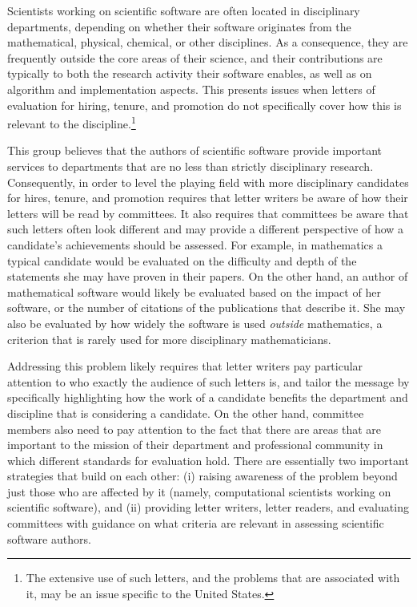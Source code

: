 \documentclass[11pt, oneside]{amsart}
\begin{document}
Scientists working on scientific software are often located in
disciplinary departments, depending on whether their software
originates from the mathematical, physical, chemical, or other
disciplines. As a consequence, they are frequently outside the core
areas of their science, and their contributions are typically to both
the research activity their software enables, as well as on
algorithm and implementation aspects. This presents issues when
letters of evaluation for hiring, tenure, and promotion do not specifically
cover how this is relevant to the discipline.\footnote{The extensive use of such letters, and the problems that are
  associated with it, may be an issue specific to the United States.}

This group believes that the authors of scientific software provide important
services to departments that are no less than strictly disciplinary
research. Consequently, in order to level the playing field with more
disciplinary candidates for hires, tenure, and promotion requires that
letter writers be aware of how their letters will be read by
committees. It also requires that committees be aware that such
letters often look different and may provide a different perspective
of how a candidate's achievements should be assessed. For example, in
mathematics a typical candidate would be evaluated on the difficulty
and depth of the statements she may have proven in their papers. On
the other hand, an author of mathematical software would likely be
evaluated based on the impact of her software, or the number of citations of
the publications that describe it. She may also be evaluated by how
widely the software is used \textit{outside} mathematics, a criterion
that is rarely used for more disciplinary mathematicians.

Addressing this problem likely requires that letter writers pay
particular attention to who exactly the audience of such letters is,
and tailor the message by specifically highlighting how the work of a
candidate benefits the department and discipline that is considering a
candidate. On the other hand, committee members also need to pay
attention to the fact that there are areas that are important to the mission of
their department and professional community in which different
standards for evaluation hold.
%
There are essentially two important strategies that build on each
other: (i) raising awareness of the problem beyond just those who are
affected by it (namely, computational scientists working on scientific
software), and (ii) providing letter writers, letter readers, and
evaluating committees with guidance on what criteria are relevant in
assessing scientific software authors.
\end{document}
